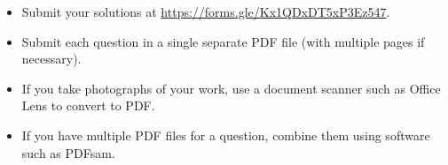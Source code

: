 \documentclass{article}
\begin{document}
\vfill
\begin{itemize}
	\item Submit your solutions at \url{https://forms.gle/Kx1QDxDT5xP3Ez547}.
	\item Submit each question in a single separate PDF file (with multiple pages if necessary).
	\item If you take photographs of your work, use a document scanner such as Office Lens to convert to PDF.
	\item If you have multiple PDF files for a question, combine them using software such as PDFsam.
\end{itemize}
\end{document}
